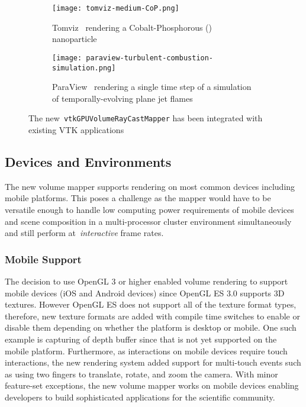 \begin{figure}[htb]
  \begin{subfigure}[t]{\columnwidth}
    \texttt{[image: tomviz-medium-CoP.png]}
    \caption{Tomviz~\protect\citep{hanwell_tomviz_2014} rendering a
      Cobalt-Phosphorous ()
      nanoparticle~\protect\citep{levin_nanomaterial_2016}}
    \label{fig:tomviz-cop}
  \end{subfigure}
  \begin{subfigure}[t]{\columnwidth}
    \texttt{[image: paraview-turbulent-combustion-simulation.png]}
    \caption{ParaView~\protect\citep{ahrens_paraview:_2005, ayachit_paraview_2015,
      ayachit_paraview_2015-1} rendering a single time step of a simulation of
      temporally-evolving plane jet
      flames~\protect\citep{hiroshi_akiba_visualizing_2007}}
    \label{fig:paraview-turbulent-combustion}
  \end{subfigure}
  \caption{The new~\texttt{vtkGPUVolumeRayCastMapper} has been integrated with
    existing VTK applications}
  \label{fig:application-areas}
\end{figure}

\subsection{Devices and Environments}
\label{devices-and-environments}
The new volume mapper supports rendering on most common devices including mobile
platforms.  This poses a challenge as the mapper would have to be versatile
enough to handle low computing power requirements of mobile devices and scene
composition in a multi-processor cluster environment simultaneously and still
perform at~\textit{interactive} frame rates. 

\subsubsection{Mobile Support}
\label{mobile}
The decision to use OpenGL 3 or higher enabled volume rendering to support
mobile devices (iOS and Android devices) since OpenGL ES 3.0 supports 3D textures.
However OpenGL ES does not support all of the texture format types, therefore,
new texture formats are added with compile time switches to enable or
disable them depending on whether the platform is desktop or mobile. One such
example is capturing of depth buffer since that is not yet supported on the
mobile platform.  Furthermore, as interactions on mobile devices require touch
interactions, the new rendering system added support for multi-touch events
such as using two fingers to translate, rotate, and zoom the camera. With minor
feature-set exceptions, the new volume mapper works on mobile devices enabling
developers to build sophisticated applications for the scientific community.


